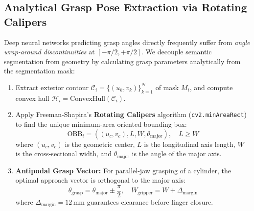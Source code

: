 \documentclass[10pt,a4paper]{article}
\begin{document}
\subsection{Analytical Grasp Pose Extraction via Rotating Calipers}
Deep neural networks predicting grasp angles directly frequently suffer from \textit{angle wrap-around discontinuities} at $[-\pi/2, +\pi/2]$. We decouple semantic segmentation from geometry by calculating grasp parameters analytically from the segmentation mask:
\begin{enumerate}
    \item Extract exterior contour $\mathcal{C}_i = \{(u_k, v_k)\}_{k=1}^N$ of mask $M_i$, and compute convex hull $\mathcal{H}_i = \text{ConvexHull}(\mathcal{C}_i)$.
    \item Apply Freeman-Shapira's \textbf{Rotating Calipers} algorithm (\texttt{cv2.minAreaRect}) to find the unique minimum-area oriented bounding box:
    \begin{equation}
        \text{OBB}_i = \left( (u_c, v_c), L, W, \theta_{\text{major}} \right), \quad L \ge W
    \end{equation}
    where $(u_c, v_c)$ is the geometric center, $L$ is the longitudinal axis length, $W$ is the cross-sectional width, and $\theta_{\text{major}}$ is the angle of the major axis.
    \item \textbf{Antipodal Grasp Vector:} For parallel-jaw grasping of a cylinder, the optimal approach vector is orthogonal to the major axis:
    \begin{equation}
        \theta_{\text{grasp}} = \theta_{\text{major}} \pm \frac{\pi}{2}, \quad W_{\text{gripper}} = W + \Delta_{\text{margin}}
    \end{equation}
    where $\Delta_{\text{margin}} = 12\,\text{mm}$ guarantees clearance before finger closure.
\end{enumerate}
\end{document}

